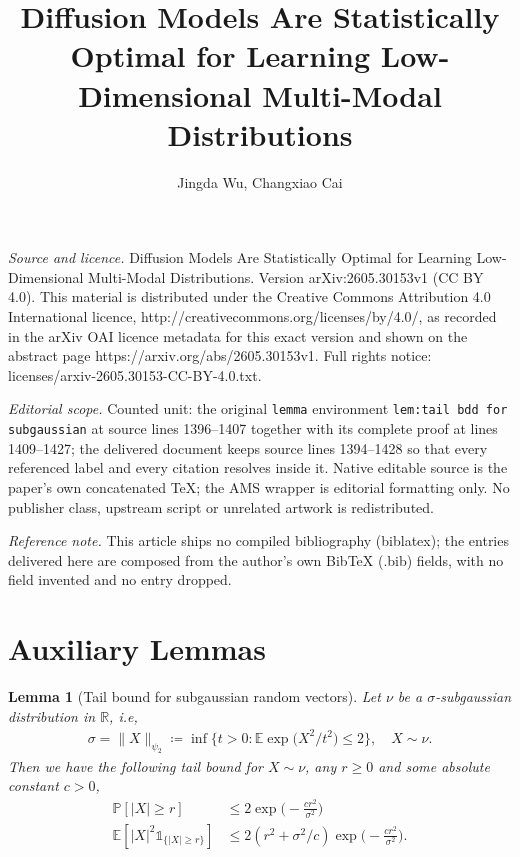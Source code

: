 \documentclass[10pt,a4paper]{amsart}
\newcommand{\ind}{\mathds{1}}
\newcommand{\defn}{\coloneqq}
\newtheorem{lemma}{\bf Lemma}
\begin{document}
\title[Diffusion Models Are Statistically Optimal for Learning Low-]{Diffusion Models Are Statistically Optimal for Learning Low-Dimensional Multi-Modal Distributions}
\author{Jingda Wu, Changxiao Cai}
\date{}
\maketitle
\noindent\emph{Source and licence.} Diffusion Models Are Statistically Optimal for Learning Low-Dimensional Multi-Modal Distributions. Version arXiv:2605.30153v1 (CC BY 4.0). This material is distributed under the Creative Commons Attribution 4.0 International licence, http://creativecommons.org/licenses/by/4.0/, as recorded in the arXiv OAI licence metadata for this exact version and shown on the abstract page https://arxiv.org/abs/2605.30153v1. Full rights notice: licenses/arxiv-2605.30153-CC-BY-4.0.txt.\par\smallskip
\noindent\textit{Editorial scope.} Counted unit: the original \texttt{lemma} environment \texttt{lem:tail bdd for subgaussian} at source lines 1396--1407 together with its complete proof at lines 1409--1427; the delivered document keeps source lines 1394--1428 so that every referenced label and every citation resolves inside it. Native editable source is the paper's own concatenated TeX; the AMS wrapper is editorial formatting only. No publisher class, upstream script or unrelated artwork is redistributed.
\par\smallskip\noindent\textit{Reference note.} This article ships no compiled bibliography (biblatex); the entries delivered here are composed from the author's own BibTeX (.bib) fields, with no field invented and no entry dropped.
\section{Auxiliary Lemmas}

\begin{lemma}[Tail bound for subgaussian random vectors]
        \label{lem:tail bdd for subgaussian}
        Let $\nu$ be a $\sigma$-subgaussian distribution in $\mathbb{R}$, i.e, 
    \begin{align}
        \sigma = \| X\|_{\psi_2} \defn \inf \Big\{ t>0: \mathbb{E}\exp \big(X^2/t^2\big) \leq 2\Big\}, \quad X\sim \nu\label{eq:subgaussian def}.
    \end{align}
    Then we have the following tail bound for $X \sim \nu$, any $r\geq 0$ and some absolute constant $c>0$, 
    \begin{align}
        \mathbb{P}[|X| \geq r] &\leq  2\exp\big(-\frac{cr^2}{\sigma^2}\big) \label{eq:subgaussian tail bdd} \\
        \mathbb{E}[|X|^2 \ind_{\{|X|\geq r\}}] & \leq 2 (r^2 + \sigma^2/c) \exp\big(-\frac{cr^2}{\sigma^2}\big) .\label{eq:subgaussian tail bdd of second moment}
    \end{align}
\end{lemma}
\end{document}
